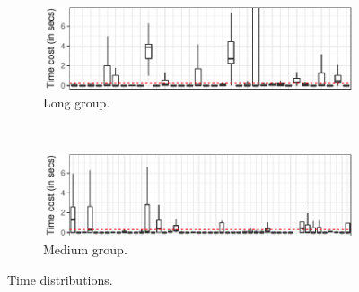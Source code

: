 \begin{figure}[h]
    \centering
    \begin{subfigure}{0.47\textwidth}
      \centering
      \includegraphics[width=\textwidth]{plots/testcost-long.pdf}
      \caption{\label{fig:longtcost}Long group.}
    \end{subfigure}\\
    \vspace{2ex}
    \begin{subfigure}{0.47\textwidth}
      \centering
      \includegraphics[width=\textwidth]{plots/testcost-medium.pdf}
      \caption{\label{fig:medtcost}Medium group.}
    \end{subfigure}
    \caption{\label{fig:time-distributions}Time distributions.}%
\end{figure}


